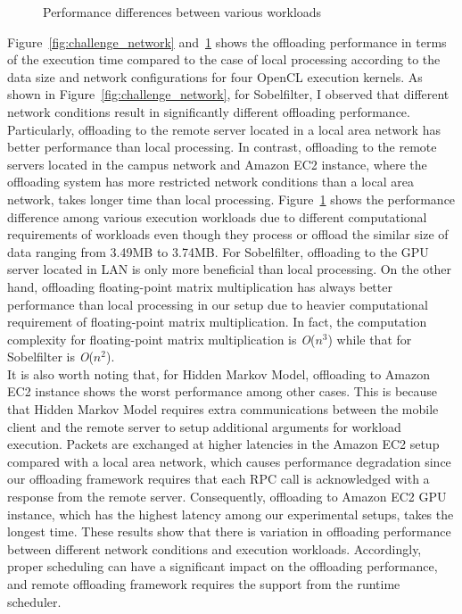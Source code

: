 %
\begin{figure}
\centering
{}
\caption{Performance differences between various workloads}
\label{fig:challenge_workload}
\end{figure}
%
Figure~\ref{fig:challenge_network} and~\ref{fig:challenge_workload}
shows the offloading performance in terms of the
execution time compared to the case of local processing according to
the data size and network configurations for four OpenCL execution
kernels.
%
As shown in Figure~\ref{fig:challenge_network}, for Sobelfilter, I observed that different
network conditions result in significantly different offloading
performance.
%
Particularly, offloading to the remote server located in a local area
network has better performance than local processing.
%
In contrast, offloading to the remote servers located in the campus network
and Amazon EC2 instance, where the offloading system has more restricted network conditions
than a local area network, takes longer time than local processing. 
%
Figure~\ref{fig:challenge_workload} shows the performance difference among various execution
workloads due to different computational requirements of workloads 
even though they process or offload the similar size of data ranging 
from 3.49MB to 3.74MB.
%
For Sobelfilter, offloading to the GPU server located in LAN is only
more beneficial than local processing.
%
On the other hand, offloading floating-point matrix multiplication has
always better performance than local processing in our setup due to
heavier computational requirement of floating-point matrix
multiplication.
%
In fact, the computation complexity for floating-point matrix
multiplication is {\it O}($n^{3}$) while that for Sobelfilter is
{\it O}($n^{2}$).\\
%
It is also worth noting that, for Hidden Markov Model, offloading to 
Amazon EC2 instance shows the worst performance among other cases.
%
This is because that Hidden Markov Model requires extra communications
between the mobile client and the remote server to setup additional
arguments for workload execution.
%
Packets are exchanged at higher latencies in the Amazon EC2 setup
compared with a local area network, which causes performance degradation
since our offloading framework requires that each RPC call is acknowledged 
with a response from the remote server.
%
Consequently, offloading to Amazon EC2 GPU instance, which has the
highest latency among our experimental setups, takes the longest time.
%
These results show that there is variation in offloading performance
between different network conditions and execution workloads.
%
Accordingly, proper scheduling can have a significant impact on the
offloading performance, and remote offloading framework requires the
support from the runtime scheduler.
%
